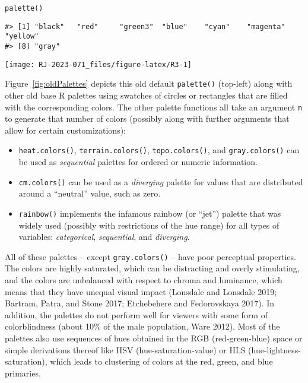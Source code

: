 \begin{verbatim}
palette()
\end{verbatim}

\begin{verbatim}
#> [1] "black"   "red"     "green3"  "blue"    "cyan"    "magenta" "yellow" 
#> [8] "gray"
\end{verbatim}

\texttt{[image: RJ-2023-071\_files/figure-latex/R3-1]}

Figure~\ref{fig:oldPalettes}
depicts this old default \texttt{palette()} (top-left) along
with other old base R palettes using swatches of circles or
rectangles that are filled with the
corresponding colors. The other palette functions all take an argument \texttt{n} to generate
that number of colors (possibly along with further arguments that allow for
certain customizations):

\begin{itemize}
\tightlist
\item
  \texttt{heat.colors()}, \texttt{terrain.colors()}, \texttt{topo.colors()}, and \texttt{gray.colors()}
  can be used as \emph{sequential} palettes for ordered or numeric information.
\item
  \texttt{cm.colors()} can be used as a \emph{diverging} palette for values that are
  distributed around a ``neutral'' value, such as zero.
\item
  \texttt{rainbow()} implements the infamous rainbow (or ``jet'') palette
  that was widely used (possibly with restrictions of the hue range)
  for all types of variables: \emph{categorical}, \emph{sequential}, and \emph{diverging}.
\end{itemize}

All of these palettes -- except \texttt{gray.colors()} -- have poor perceptual properties.
The colors are highly saturated, which can be distracting and overly
stimulating, and the colors are unbalanced with respect to chroma and luminance,
which means that they have unequal visual impact
(Lonsdale and Lonsdale 2019; Bartram, Patra, and Stone 2017; Etchebehere and Fedorovskaya 2017).
In addition, the palettes do not perform well for viewers with some form
of colorblindness (about 10\% of the male population, Ware 2012).
Most of the palettes also use sequences
of hues obtained in the RGB (red-green-blue) space or simple derivations thereof like HSV (hue-saturation-value) or HLS (hue-lightness-saturation),
which leads to clustering of colors at the red, green, and blue primaries.


